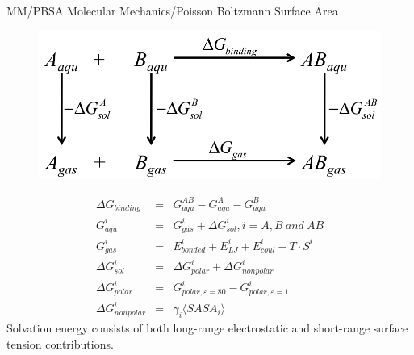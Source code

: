 \documentclass{beamer}
\begin{document}
\begin{frame}{MM/PBSA}
Molecular Mechanics/Poisson Boltzmann Surface Area 
\vspace{-.5cm}
\begin{figure}
	\centering
	\includegraphics[width=.5\textwidth]{Pics/MMPBSA.png}
\end{figure}
\vspace{-.7cm}
\centering
\begin{eqnarray}
	\Delta G_{binding} &=& G_{aqu}^{AB}- G_{aqu}^{A} - G_{aqu}^{B} \\
	G_{aqu}^{i} &=& G_{gas}^i + \Delta G_{sol}^i, i=A,B\ and\ AB \\
	G_{gas}^{i} &=& E_{bonded}^{i} + E_{LJ}^{i} +E_{coul}^i - T \cdot S^i\\
	\Delta G_{sol}^i &=& \Delta G_{polar}^i + \Delta G_{nonpolar}^i\\
	\Delta G_{polar}^i &=& G_{polar, \varepsilon = 80}^i - G_{polar, \varepsilon=1}^i\\
	\Delta G_{nonpolar}^i &=& \gamma _i \langle SASA_i \rangle
\end{eqnarray} 
Solvation energy consists of both long-range electrostatic and short-range surface tension contributions.
\end{frame}
\end{document}

